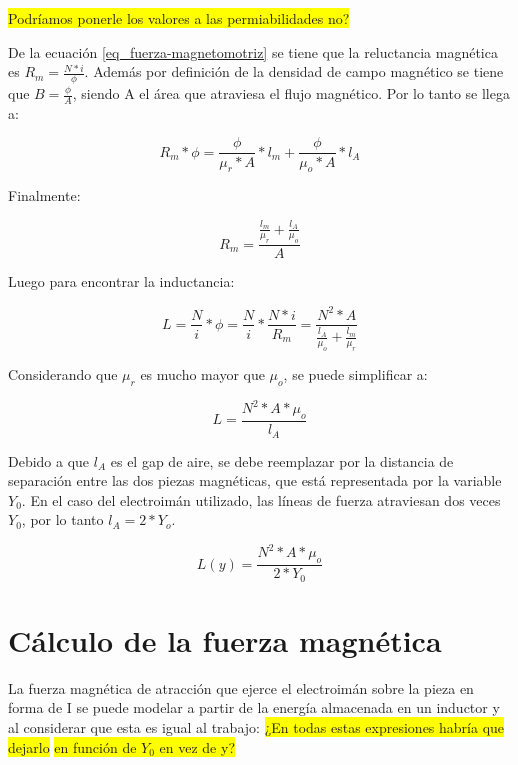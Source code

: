 \noindent \colorbox{yellow}{Podríamos ponerle los valores a las permiabilidades no?}

\noindent De la ecuación \ref{eq_fuerza-magnetomotriz} se tiene que la reluctancia magnética es $R_{m}=\frac{N*i}{\phi}$. Además por definición de la densidad de campo magnético se tiene que $B=\frac{\phi}{A}$, siendo A el área que atraviesa el flujo magnético. Por lo tanto se llega a:

\begin{equation}
		R_{m}*\phi=\frac{\phi}{\mu_{r}*A}*l_{m}+\frac{\phi}{\mu_{o}*A}*l_{A}
\end{equation}

\noindent Finalmente:

\begin{equation}
	R_{m}=\frac{\frac{l_{m}}{\mu_{r}}+\frac{l_{A}}{\mu_{o}}}{A}
\end{equation}

\noindent Luego para encontrar la inductancia:

\begin{equation}\label{eq_inductancia_2}
	L=\frac{N}{i}*\phi=\frac{N}{i}*\frac{N*i}{R_{m}}=\frac{N^{2}*A}{\frac{l_{A}}{\mu_{o}}+\frac{l_{m}}{\mu_{r}}}
\end{equation}

\noindent Considerando que $\mu_{r}$ es mucho mayor que $\mu_{o}$, se puede simplificar a:

\begin{equation} \label{eq_inductancia_gap}
	L=\frac{N^{2}*A*\mu_{o}}{l_{A}}
\end{equation}

\noindent \noindent Debido a que $l_{A}$ es el gap de aire, se debe reemplazar por la distancia de separación entre las dos piezas magnéticas, que está representada por la variable $Y_{0}$. En el caso del electroimán utilizado, las líneas de fuerza atraviesan dos veces $Y_{0}$, por lo tanto $l_{A}=2*Y_{o}$.


\begin{equation}\label{eq_inductancia_vs_y}
		L(y)=\frac{{N^{2}*A*\mu_{o}}}{2*Y_{0}}
\end{equation}

\section{Cálculo de la fuerza magnética}

\noindent La fuerza magnética de atracción que ejerce el electroimán sobre la pieza en forma de I se puede modelar a partir de la energía almacenada en un inductor y al considerar que esta es igual al trabajo:
\colorbox{yellow}{¿En todas estas expresiones habría que dejarlo}
\noindent
 \colorbox{yellow}{en función de $Y_0$ en vez de y?}

